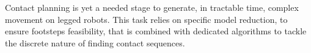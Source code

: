 




Contact planning is yet a needed stage to generate, in tractable time, complex movement on legged robots.
This task relies on specific model reduction, to ensure footsteps feasibility, that is combined with dedicated algorithms to tackle the discrete nature of finding contact sequences.


